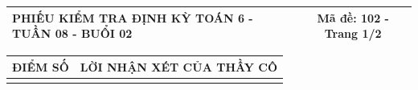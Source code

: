 \documentclass[12pt,a4paper]{article}
\begin{document}
\newpage


\noindent
\begin{tabularx}{\linewidth}{|X|c|}
\hline
\textbf{PHIẾU KIỂM TRA ĐỊNH KỲ TOÁN 6 - TUẦN 08 - BUỔI 02} & \textbf{Mã đề: 102 - Trang 1/2} \\
\hline
\end{tabularx}

\vspace{1mm}

\noindent
\begin{tabularx}{\linewidth}{|p{3.2cm}|X|}
\hline
\centering\textbf{ĐIỂM SỐ} & \centering\textbf{LỜI NHẬN XÉT CỦA THẦY CÔ} \tabularnewline
\hline
\rule{0pt}{1.8cm} & \tabularnewline
\hline
\end{tabularx}

\vspace{1.2mm}
\end{document}
